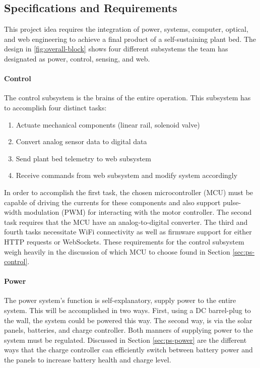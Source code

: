 \subsection{Specifications and Requirements}
This project idea requires the integration of power, systems, computer, optical, and web engineering to achieve a final product of a self-sustaining plant bed. The design in \autoref{fig:overall-block} shows four different subsystems the team has designated as power, control, sensing, and web.

\paragraph{Control}
The control subsystem is the brains of the entire operation. This subsystem has to accomplish four distinct tasks:
\begin{enumerate}
    \item Actuate mechanical components (linear rail, solenoid valve)
    \item Convert analog sensor data to digital data
    \item Send plant bed telemetry to web subsystem
    \item Receive commands from web subsystem and modify system accordingly
\end{enumerate}
In order to accomplish the first task, the chosen microcontroller (MCU) must be capable of driving the currents for these components and also support pulse-width modulation (PWM) for interacting with the motor controller. The second task requires that the MCU have an analog-to-digital converter. The third and fourth tasks necessitate WiFi connectivity as well as firmware support for either HTTP requests or WebSockets. These requirements for the control subsystem weigh heavily in the discussion of which MCU to choose found in Section \ref{sec:ps-control}.
\paragraph{Power}
The power system's function is self-explanatory, supply power to the entire system. This will be accomplished in two ways. First, using a DC barrel-plug to the wall, the system could be powered this way. The second way, is via the solar panels, batteries, and charge controller. Both manners of supplying power to the system must be regulated. Discussed in Section \ref{sec:ps-power} are the different ways that the charge controller can efficiently switch between battery power and the panels to increase battery health and charge level.
